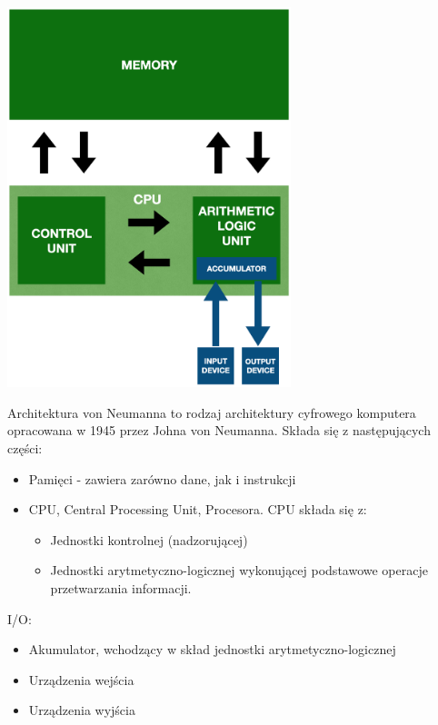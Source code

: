 \documentclass[12pt]{article}
\begin{document}
    \begin{center}
        \includegraphics[width=0.62\textwidth]{graphics/von_neumann.png}
    \end{center}
    
    Architektura von Neumanna to rodzaj architektury cyfrowego komputera opracowana w 1945 przez Johna von Neumanna.
    Składa się z następujących części:
    
    \begin{itemize}
    \item Pamięci - zawiera zarówno dane, jak i instrukcji
    \item CPU, Central Processing Unit, Procesora. CPU składa się z:
        \begin{itemize}
            \item Jednostki kontrolnej (nadzorującej)
            \item Jednostki arytmetyczno-logicznej wykonującej podstawowe operacje przetwarzania informacji. 
        \end{itemize}
    \end{itemize}
    
    I/O:
    \begin{itemize}
        \item Akumulator, wchodzący w skład jednostki arytmetyczno-logicznej
        \item Urządzenia wejścia
        \item Urządzenia wyjścia
    \end{itemize}
    
\end{document}
